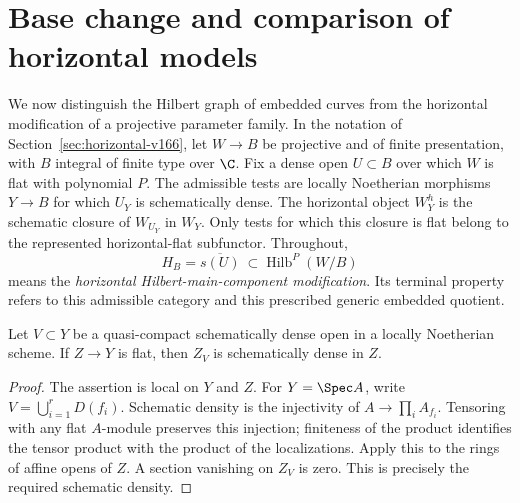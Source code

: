 \section{Base change and comparison of horizontal models}
\label{sec:comparison-v167}
We now distinguish the Hilbert graph of embedded curves from the
horizontal modification of a projective parameter family. In the
notation of Section~\ref{sec:horizontal-v166}, let $W\to B$ be
projective and of finite presentation, with $B$ integral of finite
type over $\C$. Fix a dense open $U\subset B$ over which $W$ is
flat with polynomial $P$. The admissible tests are locally
Noetherian morphisms $Y\to B$ for which $U_Y$ is schematically
dense. The horizontal object $W_Y^h$ is the schematic closure of
$W_{U_Y}$ in $W_Y$. Only tests for which this closure is flat
belong to the represented horizontal-flat subfunctor. Throughout,
\[
 H_B=\overline{s(U)}\ \subset\operatorname{Hilb}^{P}(W/B)
\]
means the \emph{horizontal Hilbert-main-component modification}.
Its terminal property refers to this admissible category and
this prescribed generic embedded quotient.

\begin{lemma}\label{lem:density-v167}
Let $V\subset Y$ be a quasi-compact schematically dense open in a
locally Noetherian scheme. If $Z\to Y$ is flat, then $Z_V$ is
schematically dense in $Z$.
\end{lemma}
\begin{proof}
The assertion is local on $Y$ and $Z$. For $Y=\Spec A$, write
$V=\bigcup_{i=1}^rD(f_i)$. Schematic density is the injectivity
of $A\to\prod_i A_{f_i}$. Tensoring with any flat $A$-module
preserves this injection; finiteness of the product identifies
the tensor product with the product of the localizations. Apply
this to the rings of affine opens of $Z$. A section vanishing on
$Z_V$ is zero. This is precisely the required schematic density.
\end{proof}

